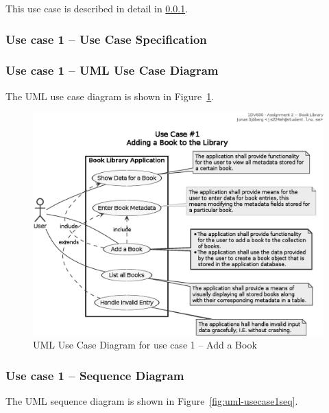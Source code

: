 This use case is described in detail in \ref{task-1a-usecase1spec}.


\subsubsection{Use case 1 -- Use Case Specification}\label{task-1a-usecase1spec}



\subsubsection{Use case 1 -- UML Use Case Diagram}\label{task-1a-usecase1uml}
The UML use case diagram is shown in Figure~\ref{fig:uml-usecase1}.

\begin{figure}[htbp]
  \centering
  \includegraphics[width=\linewidth]{include/uml-use-case-1.eps}
  \caption{UML Use Case Diagram for use case 1 -- Add a Book}
  \label{fig:uml-usecase1}
\end{figure}




\subsubsection{Use case 1 -- Sequence Diagram}\label{task-1a-usecase1seq}
The UML sequence diagram is shown in Figure~\ref{fig:uml-usecase1seq}.

